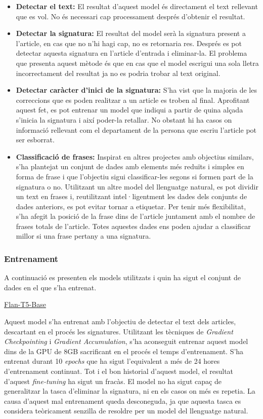 \begin{itemize}
     \item \textbf{Detectar el text:} El resultat d'aquest model és directament el text rellevant que es vol. No és necessari cap processament després d'obtenir el resultat.
     \item \textbf{Detectar la signatura:} El resultat del model serà la signatura present a l'article, en cas que no n'hi hagi cap, no es retornaria res. Després es pot detectar aquesta signatura en l'article d'entrada i eliminar-la. El problema que presenta aquest mètode és que en cas que el model escrigui una sola lletra incorrectament del resultat ja no es podria trobar al text original.
     \item \textbf{Detectar caràcter d'inici de la signatura:} S'ha vist que la majoria de les correccions que es poden realitzar a un article es troben al final. Aprofitant aquest fet, es pot entrenar un model que indiqui a partir de quina alçada s'inicia la signatura i així poder-la retallar. No obstant hi ha casos on informació rellevant com el departament de la persona que escriu l'article pot ser esborrat.
     \item \textbf{Classificació de frases:} Inspirat en altres projectes amb objectius similars, s'ha plantejat un conjunt de dades amb elements més reduïts i simples en forma de frase i que l'objectiu sigui classificar-les segons si formen part de la signatura o no. Utilitzant un altre model del llenguatge natural, es pot dividir un text en frases i, reutilitzant intel·ligentment les dades dels conjunts de dades anteriors, es pot evitar tornar a etiquetar. Per tenir més flexibilitat, s'ha afegit la posició de la frase dins de l'article juntament amb el nombre de frases totals de l'article. Totes aquestes dades ens poden ajudar a classificar millor si una frase pertany a una signatura.
\end{itemize}

\subsubsection{Entrenament}
A continuació es presenten els models utilitzats i quin ha sigut el conjunt de dades en el que s'ha entrenat.

\underline{Flan-T5-Base}

Aquest model s'ha entrenat amb l'objectiu de detectar el text dels articles, descartant en el procés les signatures. Utilitzant les tècniques de \textit{Gradient Checkpointing} i \textit{Gradient Accumulation}, s'ha aconseguit entrenar aquest model dins de la GPU de 8GB sacrificant en el procés el temps d'entrenament. S'ha entrenat durant 10 \textit{epochs} que ha sigut l'equivalent a més de 24 hores d'entrenament continuat.
Tot i el bon historial d'aquest model, el resultat d'aquest \textit{fine-tuning} ha sigut un fracàs. El model no ha sigut capaç de generalitzar la tasca d'eliminar la signatura, ni en els casos on més es repetia. La causa d'aquest mal entrenament queda desconeguda, ja que aquesta tasca es considera teòricament senzilla de resoldre per un model del llenguatge natural.

